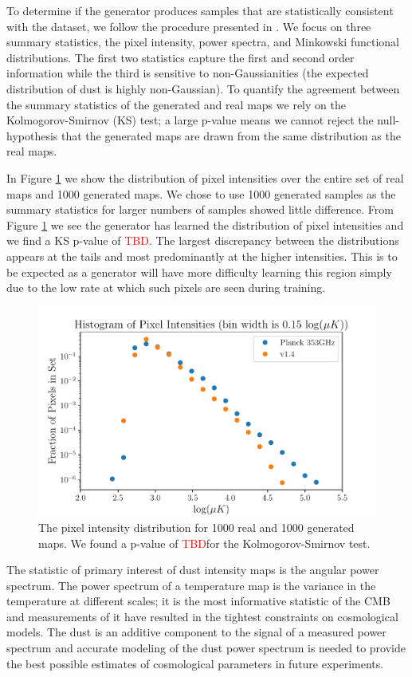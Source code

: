 \documentclass[twocolumn]{aastex62}
\def\tbd{\textcolor{red}{TBD}}
\begin{document}
To determine if the generator produces samples that are statistically consistent with the dataset, we follow the procedure presented in \cite{mustafa17}. We focus on three summary statistics, the pixel intensity, power spectra, and Minkowski functional distributions. The first two statistics capture the first and second order information while the third is sensitive to  non-Gaussianities (the expected distribution of dust is highly non-Gaussian). To quantify the agreement between the summary statistics of the generated and real maps we rely on the Kolmogorov-Smirnov (KS) test; a large p-value means we cannot reject the null-hypothesis that the generated maps are drawn from the same distribution as the real maps.

In Figure \ref{fig:pix_int} we show the distribution of pixel intensities over the entire set of real maps and 1000 generated maps. We chose to use 1000 generated samples as the summary statistics for larger numbers of samples showed little difference. From Figure \ref{fig:pix_int} we see the generator has learned the distribution of pixel intensities and we find a KS p-value of \tbd. The largest discrepancy between the distributions appears at the tails and most predominantly at the higher intensities. This is to be expected as a generator will have more difficulty learning this region simply due to the low rate at which such pixels are seen during training. 



\begin{figure}
\includegraphics[width = .5\textwidth]{HistPixIntensity.pdf}
\caption{The pixel intensity distribution for 1000 real and 1000 generated maps. We found a p-value of \tbd for the Kolmogorov-Smirnov test.}
\label{fig:pix_int}
\end{figure}

The statistic of primary interest of dust intensity maps is the angular power spectrum. The power spectrum of a temperature map is the variance in the temperature at different scales; it is the most informative statistic of the CMB and measurements of it have resulted in the tightest constraints on cosmological models. The  dust is an additive  component to the signal of a measured power spectrum and accurate modeling of the dust power spectrum is needed to provide the best possible estimates of cosmological parameters in future experiments. 
\end{document}
